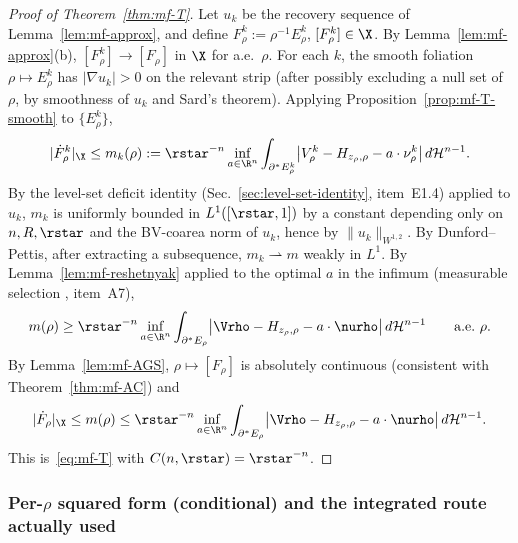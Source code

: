 \begin{proof}[Proof of Theorem~\ref{thm:mf-T}]
Let $u_k$ be the recovery sequence of Lemma~\ref{lem:mf-approx}, and define
$F^k_\rho:=\rho^{-1}E^k_\rho$, $[F^k_\rho]\in\X$. By Lemma~\ref{lem:mf-approx}(b),
$[F^k_\rho]\to[F_\rho]$ in $\X$ for a.e.~$\rho$. For each $k$, the smooth
foliation $\rho\mapsto E^k_\rho$ has $|\nabla u_k|>0$ on the relevant strip
(after possibly excluding a null set of $\rho$, by smoothness of $u_k$ and
Sard's theorem). Applying Proposition~\ref{prop:mf-T-smooth} to
$\{E^k_\rho\}$,
\begin{equation}\label{eq:mf-Tk}
   |\dot F^k_\rho|_\X\le m_k(\rho):=
   \rstar^{-n}\inf_{a\in\R^n}\int_{\partial^*E^k_\rho}
      \bigl|V^k_\rho-H_{z_\rho,\rho}-a\cdot\nu^k_\rho\bigr|
      \,d\mathcal H^{n-1}.
\end{equation}
By the level-set deficit identity (Sec.~\ref{sec:level-set-identity},
item~E1.4) applied to $u_k$, $m_k$ is uniformly bounded in $L^1([\rstar,1])$
by a constant depending only on $n,R,\rstar$ and the BV-coarea norm of $u_k$,
hence by $\|u_k\|_{W^{1,2}}$. By Dunford--Pettis, after extracting a
subsequence, $m_k\rightharpoonup m$ weakly in $L^1$. By
Lemma~\ref{lem:mf-reshetnyak} applied to the optimal $a$ in the infimum
(measurable selection \cite[Thm.~8.2.11]{AubinFrankowska1990}, item~A7),
\begin{equation}\label{eq:mf-mlim}
   m(\rho)\ge\rstar^{-n}\inf_{a\in\R^n}\int_{\partial^*E_\rho}
      \bigl|\Vrho-H_{z_\rho,\rho}-a\cdot\nurho\bigr|\,d\mathcal H^{n-1}
   \qquad\text{a.e.~}\rho.
\end{equation}
By Lemma~\ref{lem:mf-AGS}, $\rho\mapsto[F_\rho]$ is absolutely continuous
(consistent with Theorem~\ref{thm:mf-AC}) and
\begin{equation}
   |\dot F_\rho|_\X\le m(\rho)
   \le\rstar^{-n}\inf_{a\in\R^n}\int_{\partial^*E_\rho}
      \bigl|\Vrho-H_{z_\rho,\rho}-a\cdot\nurho\bigr|\,d\mathcal H^{n-1}.
\end{equation}
This is~\eqref{eq:mf-T} with $C(n,\rstar)=\rstar^{-n}$.
\end{proof}

\subsubsection{Per-$\rho$ squared form (conditional) and the integrated route
actually used}
\label{sec:metric-T-summary}

